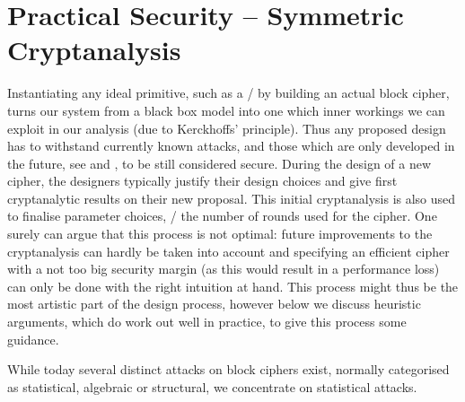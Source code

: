 \section{Practical Security -- Symmetric Cryptanalysis}\label{sec:prelim:cryptanalysis}
Instantiating any ideal primitive, such as a \PRP/ by building an actual block cipher, turns our system from a black box model into one which inner workings we can exploit in our analysis (due to Kerckhoffs' principle).
Thus any proposed design has to withstand currently known attacks, and those which are only developed in the future, see  and , to be still considered secure.
During the design of a new cipher, the designers typically justify their design choices and give first cryptanalytic results on their new proposal.
This initial cryptanalysis is also used to finalise parameter choices, \eg/ the number of rounds used for the cipher.
One surely can argue that this process is not optimal: future improvements to the cryptanalysis can hardly be taken into account and specifying an efficient cipher with a not too big security margin (as this would result in a performance loss) can only be done with the right intuition at hand.
This process might thus be the most artistic part of the design process, however below we discuss heuristic arguments, which do work out well in practice, to give this process some guidance.

While today several distinct attacks on block ciphers exist, normally categorised as statistical, algebraic or structural, we concentrate on statistical attacks.

